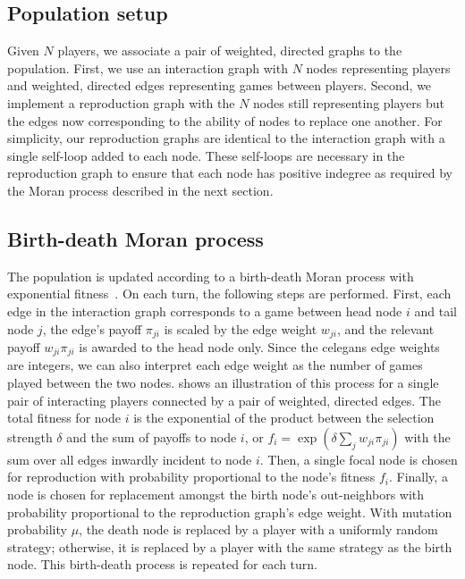\documentclass[pdflatex,lineno,referee,sn-nature]{sn-jnl}
\begin{document}
\subsection{Population setup}\label{sec:pop_setup}

Given $N$ players, we associate a pair
of weighted, directed graphs to the population.
First, we use an interaction graph with $N$ nodes representing players
and weighted, directed edges representing games between players.
Second, we implement a reproduction graph with the $N$ nodes
still representing players
but the edges now corresponding to the ability of nodes to replace one another.
For simplicity, our reproduction graphs are identical to the interaction graph
with a single self-loop added to each node.
These self-loops are necessary in the reproduction graph
to ensure that each node has positive indegree
as required by the Moran process described in the next section.

\subsection{Birth-death Moran process}\label{sec:evo_setup}
The population is updated according to a birth-death Moran process
with exponential fitness~\citep{lieberman2005evolutionary}.
On each turn, the following steps are performed.
First, each edge in the interaction graph corresponds to a game
between head node $i$ and tail node $j$,
the edge's payoff $\pi_{ji}$ is scaled by the edge weight $w_{ji}$,
and the relevant payoff $w_{ji} \pi_{ji}$ is awarded to the head node only.
Since the \gls{celegans} edge weights are integers,
we can also interpret each edge weight as the number of games played
between the two nodes.
 shows an illustration of this process
for a single pair of interacting players connected by a pair of
weighted, directed edges.
The total fitness for node $i$ is the exponential of the product
between the selection strength $\delta$
and the sum of payoffs to node $i$,
or $f_i = \exp(\delta \sum_j w_{ji} \pi_{ji})$ with the sum
over all edges inwardly incident to node $i$.
Then, a single focal node is chosen for reproduction
with probability proportional to the node's fitness $f_i$.
Finally, a node is chosen for replacement amongst the birth node's out-neighbors
with probability proportional to the reproduction graph's edge weight.
With mutation probability $\mu$,
the death node is replaced by a player with a uniformly random strategy;
otherwise, it is replaced by a player with the same strategy as the birth node.
This birth-death process is repeated for each turn.
\end{document}
